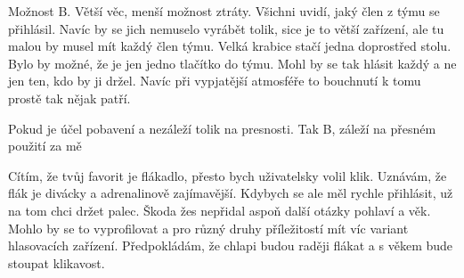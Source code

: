 \begtt
Možnost B. Větší věc, menší možnost ztráty. Všichni
uvidí, jaký člen z týmu se přihlásil. Navíc by se jich
nemuselo vyrábět tolik, sice je to větší zařízení, ale
tu malou by musel mít každý člen týmu. Velká krabice
stačí jedna doprostřed stolu. Bylo by možné, že je jen
jedno tlačítko do týmu. Mohl by se tak hlásit každý
a ne jen ten, kdo by ji držel. Navíc při vypjatější
atmosféře to bouchnutí k tomu prostě tak nějak patří.
\endtt

\begtt
Pokud je účel pobavení a nezáleží tolik na presnosti.
Tak B, záleží na přesném použití za mě
\endtt

\begtt
Cítím, že tvůj favorit je flákadlo, přesto bych
uživatelsky volil klik. Uznávám, že flák je divácky
a adrenalinově zajímavější. Kdybych se ale měl rychle
přihlásit, už na tom chci držet palec. Škoda žes nepřidal
aspoň další otázky pohlaví a věk. Mohlo by se to
vyprofilovat a pro různý druhy příležitostí mít víc
variant hlasovacích zařízení. Předpokládám, že chlapi
budou raději flákat a s věkem bude stoupat klikavost. 
\endtt